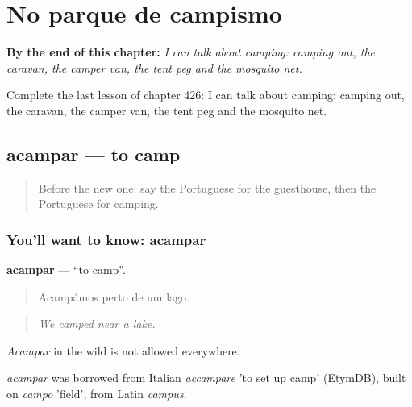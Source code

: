 
\chapter{No parque de campismo}
\label{ch:pt-no-parque-de-campismo}

\begin{chapteropening}
\textbf{By the end of this chapter:} \emph{I can talk about camping: camping out, the caravan, the camper van, the tent peg and the mosquito net.}

Complete the last lesson of chapter 426: I can talk about camping: camping out, the caravan, the camper van, the tent peg and the mosquito net.
\end{chapteropening}

\section[acampar]{acampar — to camp}

\label{lesson:PT-C426-acampar}



\begin{quote}
Before the new one: say the Portuguese for the guesthouse, then the Portuguese for camping.
\end{quote}

\subsection*{You'll want to know: acampar}
\textbf{acampar} — \textquotedblleft{}to camp\textquotedblright{}.

\begin{quote}
Acampámos perto de um lago.
\end{quote}

\begin{quote}
\emph{We camped near a lake.}
\end{quote}

\emph{Acampar} in the wild is not allowed everywhere.

\begin{cousinweb}
\emph{acampar} was borrowed from Italian \emph{accampare} 'to set up camp' (EtymDB), built on \emph{campo} 'field', from Latin \emph{campus}.
\end{cousinweb}


